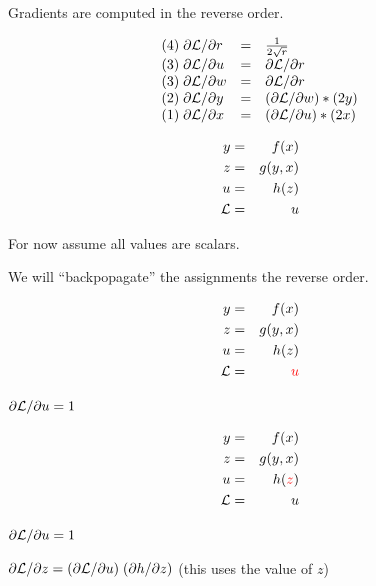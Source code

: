 {\vfill
Gradients are computed in the reverse order.

\vfill
$$\begin{array}{lcl}
(4)\; \partial{\cal L}/\partial r & = & \frac{1}{2\sqrt{r}} \\
(3)\; \partial{\cal L}/\partial u & = & \partial {\cal L}/\partial r \\
(3)\; \partial{\cal L}/\partial w & = & \partial {\cal L}/\partial r\\
(2)\; \partial{\cal L}/\partial y & = & (\partial {\cal L}/\partial w) * (2y) \\
(1)\; \partial{\cal L}/\partial x & = & (\partial {\cal L}/\partial u) * (2x)
\end{array}$$

\vspace{-3ex}
\begin{eqnarray*}
  y & = & f(x) \\
  z & = & g(y,x) \\
  u & = & h(z) \\
  {\cal L} & = & u
\end{eqnarray*}

\medskip
For now assume all values are scalars.

\medskip
We will ``backpopagate'' the assignments the reverse order.

\vspace{-3ex}
\begin{eqnarray*}
  y & = & f(x) \\
  z & = & g(y,x) \\
  u & = & h(z) \\
  {\cal L} &  = & {\color{red} u}
\end{eqnarray*}

\medskip
{\color{red} ${\partial {\cal L}}/{\partial u} = 1$}

\vspace{-3ex}
\begin{eqnarray*}
  y & = & f(x) \\
  z & = & g(y,x) \\
  u & = & h({\color{red} z}) \\
  {\cal L} &  = &  u
\end{eqnarray*}

\medskip
${\partial {\cal L}}/{\partial u} = 1$

\medskip
{\color{red} ${\partial {\cal L}}/{\partial z} = ({\partial {\cal L}}/{\partial u})\; ({\partial h}/{\partial z})$} (this uses the value of $z$)

}
